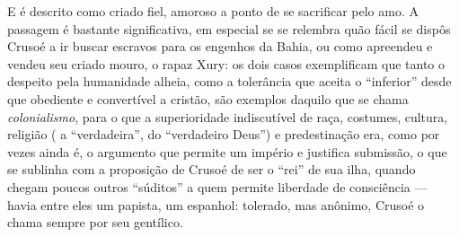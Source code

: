 E é descrito como criado fiel, amoroso a ponto de se sacrificar pelo
amo. A passagem é bastante significativa, em especial se se relembra
quão fácil se dispôs Crusoé a ir buscar escravos para os engenhos da
Bahia, ou como apreendeu e vendeu seu criado mouro, o rapaz Xury: os
dois casos exemplificam que tanto o despeito pela humanidade alheia,
como a tolerância que aceita o ``inferior'' desde que obediente e
convertível a cristão, são exemplos daquilo que se chama
\emph{colonialismo}, para o que a superioridade indiscutível de raça,
costumes, cultura, religião ( a ``verdadeira'', do ``verdadeiro Deus'')
e predestinação era, como por vezes ainda é, o argumento que permite um
império e justifica submissão, o que se sublinha com a proposição de
Crusoé de ser o ``rei'' de sua ilha, quando chegam poucos outros
``súditos'' a quem permite liberdade de consciência --- havia entre eles
um papista, um espanhol: tolerado, mas anônimo, Crusoé o chama sempre
por seu gentílico.

%


